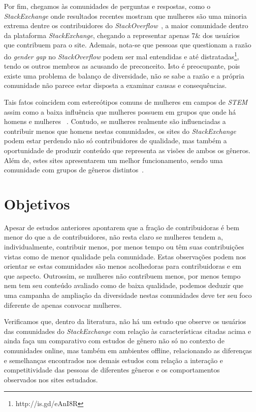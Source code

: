 Por fim, chegamos às comunidades de perguntas e respostas, como o \emph{StackExchange} onde resultados recentes mostram que mulheres são uma minoria extrema dentre os contribuidores do \emph{StackOverflow}~\cite{Vasilescu27092013}, a maior comunidade dentro da plataforma \emph{StackExchange}, chegando a representar apenas 7\& dos usuários que contribuem para o site. Ademais, nota-se que pessoas que questionam a razão do \emph{gender gap} no \emph{StackOverflow} podem ser mal entendidas e até distratadas\footnote{http://is.gd/eAnI8R}, tendo os outros membros as acusando de preconceito. Isto é preocupante, pois existe uma problema de balanço de diversidade, não se sabe a razão e a própria comunidade não parece estar disposta a examinar causas e consequências.

Tais fatos coincidem com estereótipos comuns de mulheres em campos de \emph{STEM}~\cite{spencer1999stereotype} assim como a baixa influência que mulheres possuem em grupos que onde há homens e mulheres ~\cite{karpowitz2012gender}. Contudo, se mulheres realmente são influenciadas a contribuir menos que homens nestas comunidades, os sites do \emph{StackExchange} podem estar perdendo não só contribuidores de qualidade, mas também a oportunidade de produzir conteúdo que representa as visões de ambos os gêneros. Além de, estes sites apresentarem um melhor funcionamento, sendo uma comunidade com grupos de gêneros distintos~\cite{marshall1975boys}.


\section{Objetivos}

Apesar de estudos anteriores apontarem que a fração de contribuidoras é bem menor do que a de contribuidores, não resta claro se mulheres tendem a, individualmente, contribuir menos, por menos tempo ou têm suas contribuições vistas como de menor qualidade pela comunidade. Estas observações podem nos orientar se estas comunidades são menos acolhedoras para contribuidoras e em que aspecto. Outrossim, se mulheres não contribuem menos, por menos tempo nem tem seu conteúdo avaliado como de baixa qualidade, podemos deduzir que uma campanha de ampliação da diversidade nestas comunidades deve ter seu foco diferente de apenas convocar mulheres.

Verificamos que, dentro da literatura, não há um estudo que observe os usuários das comunidades do \emph{StackExchange} com relação às características citadas acima e ainda faça um comparativo com estudos de gênero não só no contexto de comunidades online, mas também em ambientes offline, relacionando as diferenças e semelhanças encontrados nos demais estudos com relação a interação e competitividade das pessoas de diferentes gêneros e os comportamentos observados nos sites estudados.


